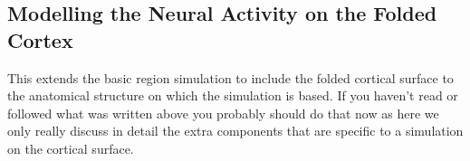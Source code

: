 \documentclass{tufte-handout}
\newenvironment{simulation}{%
  \def\FrameCommand{%
    \hspace{1pt}%
    {\color{ForestGreen}\vrule width 2pt}%
    {\color{simulationshade}\vrule width 4pt}%
    \colorbox{simulationshade}%
  }%
  \MakeFramed{\advance\hsize-\width\FrameRestore}%
  \noindent\hspace{-4.55pt}%
  \begin{adjustwidth}{}{7pt}%
  \vspace{2pt}\vspace{2pt}%
}
{%
  \vspace{2pt}\end{adjustwidth}\endMakeFramed%
}
\begin{document}
%
%
%
%
%

\newpage
\subsection{Modelling the Neural Activity on the Folded Cortex}\label{sec:surface_simulations}

This extends the basic region simulation to include the folded cortical
surface to the anatomical structure on which the simulation is based. If you
haven't read or followed what was written above you probably should do that now as
here we only really discuss in detail the extra components that are specific
to a simulation on the cortical surface.
\end{document}
